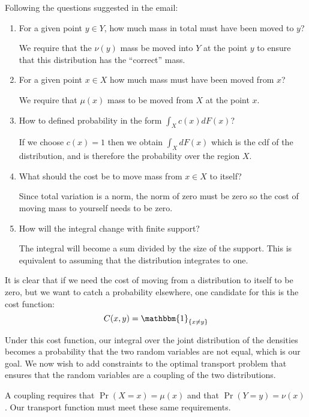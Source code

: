 \documentclass[12pt]{paper}
\newcommand{\indicate}[1]{ \mathbbm{1}_{\{#1\}}}
\begin{document}
Following the questions suggested in the email:

\begin{enumerate}
\item For a given point $y \in Y$, how much mass in total must have been
  moved to $y$?

  We require that the $\nu(y)$ mass be moved into $Y$ at the
  point $y$ to ensure that this distribution has the ``correct'' mass.
  
  
\item For a given point $x \in X$ how much mass must have been moved
  from $x$?

  We require that $\mu(x)$ mass to be moved from $X$ at the point $x$.
  
\item How to defined probability in the form $\int_X c(x)dF(x)$?

  If we choose $c(x) = 1$ then we obtain $\int_X dF(x)$ which is the cdf
  of the distribution, and is therefore the probability over the
  region $X$.
  
\item What should the cost be to move mass from $x \in X$ to itself?

  Since total variation is a norm, the norm of zero must be zero so
  the cost of moving mass to yourself needs to be zero. 
  
\item How will the integral change with finite support?

  The integral will become a sum divided by the size of the
  support. This is equivalent to assuming that the distribution
  integrates to one.
\end{enumerate}

It is clear that if we need the cost of moving from a distribution to
itself to be zero, but we want to catch a probability elsewhere, one
candidate for this is the cost function:
\begin{equation*}
  C(x,y) = \indicate{ x \neq y}
\end{equation*}

Under this cost function, our integral over the joint distribution of
the densities becomes a probability that the two random variables
are not equal, which is our goal. We now wish to add constraints to
the optimal transport problem that ensures that the random variables
are a coupling of the two distributions.

A coupling requires that $\Pr(X = x) = \mu(x)$ and that $\Pr(Y=y) =
\nu(x)$. Our transport function must meet these same requirements.
\end{document}
